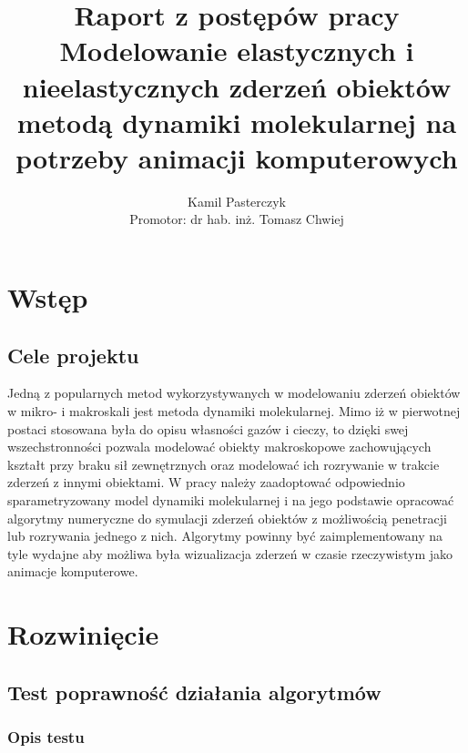 \documentclass[12pt, letterpaper]{report}
\title{
    Raport z postępów pracy \\
    \large Modelowanie elastycznych i nieelastycznych
    zderzeń obiektów\\
    metodą dynamiki molekularnej na potrzeby animacji
    komputerowych
}
\author{
    Kamil Pasterczyk \\
    \small Promotor: dr hab. inż. Tomasz Chwiej
}
\begin{document}
\maketitle
\tableofcontents

\chapter{Wstęp}
    \section{Cele projektu}
    Jedną z popularnych metod wykorzystywanych w modelowaniu zderzeń obiektów w mikro- i makroskali jest metoda dynamiki molekularnej. 
    Mimo iż w pierwotnej postaci stosowana była do opisu własności gazów i cieczy, to dzięki swej wszechstronności pozwala modelować 
    obiekty makroskopowe zachowujących kształt przy braku sił zewnętrznych oraz 
    modelować ich rozrywanie w trakcie zderzeń z innymi obiektami. 
    W pracy należy zaadoptować odpowiednio sparametryzowany model dynamiki molekularnej i na jego 
    podstawie opracować algorytmy numeryczne do symulacji zderzeń obiektów z możliwością penetracji lub rozrywania jednego z nich. 
    Algorytmy powinny być zaimplementowany na tyle wydajne aby możliwa była wizualizacja 
    zderzeń w czasie rzeczywistym jako animacje komputerowe.

\chapter{Rozwinięcie}
    \section{Test poprawność działania algorytmów}
    \subsection{Opis testu}
    
\end{document}
